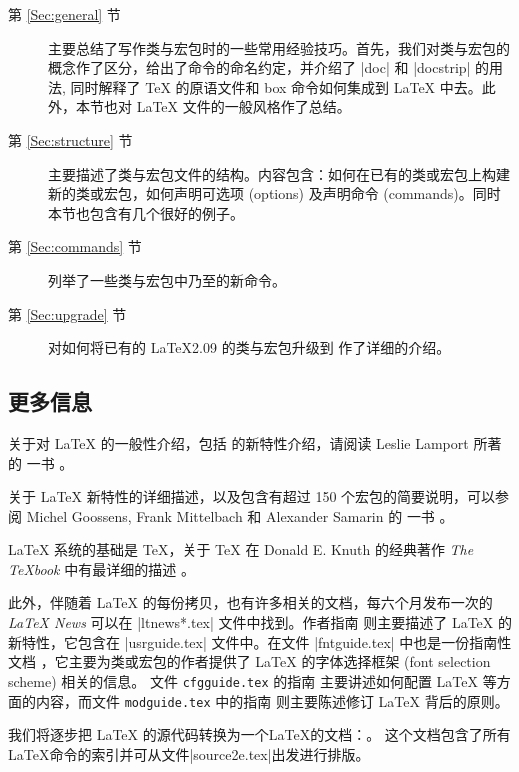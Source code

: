 \documentclass{ltxguide}[1995/11/28]
\begin{document}
\begin{description}

\item[第 \ref{Sec:general} 节] 主要总结了写作类与宏包时的一些常用经验技巧。首先，我们对类与宏包的概念作了区分，给出了命令的命名约定，并介绍了  |doc| 和 |docstrip| 的用法, 同时解释了 \TeX{} 的原语文件和 box 命令如何集成到 \LaTeX{} 中去。此外，本节也对 \LaTeX{} 文件的一般风格作了总结。

\item[第 \ref{Sec:structure} 节] 主要描述了类与宏包文件的结构。内容包含：如何在已有的类或宏包上构建新的类或宏包，如何声明可选项 (options) 及声明命令 (commands)。同时本节也包含有几个很好的例子。

\item[第 \ref{Sec:commands} 节] 列举了一些类与宏包中乃至的新命令。

\item[第 \ref{Sec:upgrade} 节] 对如何将已有的 \LaTeX 2.09 的类与宏包升级到 \LaTeXe{} 作了详细的介绍。

\end{description}

\subsection{更多信息}

关于对 \LaTeX{} 的一般性介绍，包括 \LaTeXe{} 的新特性介绍，请阅读 Leslie Lamport 所著的 \emph{\LaTeXbook} 一书 \cite{A-W:LLa94}。

关于 \LaTeX{} 新特性的详细描述，以及包含有超过 150 个宏包的简要说明，可以参阅 Michel Goossens, Frank Mittelbach 和 Alexander
Samarin 的 \emph{\LaTeXcomp} 一书 \cite{A-W:GMS94}。

\LaTeX{} 系统的基础是 \TeX{}，关于 \TeX{} 在 Donald E. Knuth 的经典著作 \emph{The \TeX book} 中有最详细的描述 \cite{A-W:DEK91}。

此外，伴随着 \LaTeX{} 的每份拷贝，也有许多相关的文档，每六个月发布一次的 \emph{\LaTeX{} News} 可以在
 |ltnews*.tex| 文件中找到。作者指南 \emph{\usrguide} 则主要描述了
 \LaTeX{} 的新特性，它包含在 |usrguide.tex| 文件中。在文件 |fntguide.tex| 中也是一份指南性文档 \emph{\fntguide}，它主要为类或宏包的作者提供了 \LaTeX{} 的字体选择框架 (font selection scheme) 相关的信息。
文件 \texttt{cfgguide.tex} 的指南 \emph{\cfgguide} 主要讲述如何配置 \LaTeX{} 等方面的内容，而文件 \texttt{modguide.tex} 中的指南 \emph{\modguide} 则主要陈述修订 \LaTeX{} 背后的原则。

我们将逐步把 \LaTeX{} 的源代码转换为一个\LaTeX{}的文档：\emph{\sourcecode}。 这个文档包含了所有\LaTeX{}命令的索引并可从文件|source2e.tex|出发进行排版。
\end{document}
